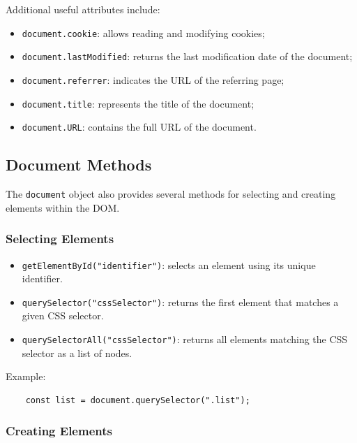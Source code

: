 \documentclass{scrbook}
\begin{document}
	Additional useful attributes include:
	
	\begin{itemize}
		\item \texttt{document.cookie}: allows reading and modifying cookies;
		
		\item \texttt{document.lastModified}: returns the last modification date of the document;
		
		\item \texttt{document.referrer}: indicates the URL of the referring page;
		
		\item \texttt{document.title}: represents the title of the document;
		
		\item \texttt{document.URL}: contains the full URL of the document.
	\end{itemize}
	
	\subsection{Document Methods}
	
	The \texttt{document} object also provides several methods for selecting and creating elements within the DOM.
	
	\subsubsection{Selecting Elements}
	
	\begin{itemize}
		\item \texttt{getElementById("identifier")}: selects an element using its unique identifier.
		
		\item \texttt{querySelector("cssSelector")}: returns the first element that matches a given CSS selector.
		
		\item \texttt{querySelectorAll("cssSelector")}: returns all elements matching the CSS selector as a list of nodes.
	\end{itemize}
	
	Example:
	
	\begin{lstlisting}
	const list = document.querySelector(".list");
	\end{lstlisting}
	
	\subsubsection{Creating Elements}
	
\end{document}
